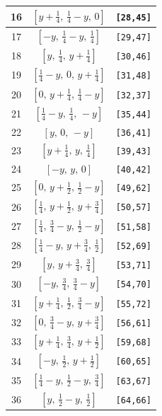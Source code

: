 \documentclass[fleqn,8pt]{jsarticle}
\begin{document}
\begin{longtable}{ccc}
16 & $\left[ y + \frac{1}{4},\, \frac{1}{4} - y,\, 0 \right]$ & {\tt [28,45]} \\ \hline
17 & $\left[ - y,\, \frac{1}{4} - y,\, \frac{1}{4} \right]$ & {\tt [29,47]} \\ \hline
18 & $\left[ y,\, \frac{1}{4},\, y + \frac{1}{4} \right]$ & {\tt [30,46]} \\ \hline
19 & $\left[ \frac{1}{4} - y,\, 0,\, y + \frac{1}{4} \right]$ & {\tt [31,48]} \\ \hline
20 & $\left[ 0,\, y + \frac{1}{4},\, \frac{1}{4} - y \right]$ & {\tt [32,37]} \\ \hline
21 & $\left[ \frac{1}{4} - y,\, \frac{1}{4},\, - y \right]$ & {\tt [35,44]} \\ \hline
22 & $\left[ y,\, 0,\, - y \right]$ & {\tt [36,41]} \\ \hline
23 & $\left[ y + \frac{1}{4},\, y,\, \frac{1}{4} \right]$ & {\tt [39,43]} \\ \hline
24 & $\left[ - y,\, y,\, 0 \right]$ & {\tt [40,42]} \\ \hline
25 & $\left[ 0,\, y + \frac{1}{2},\, \frac{1}{2} - y \right]$ & {\tt [49,62]} \\ \hline
26 & $\left[ \frac{1}{4},\, y + \frac{1}{2},\, y + \frac{3}{4} \right]$ & {\tt [50,57]} \\ \hline
27 & $\left[ \frac{1}{4},\, \frac{3}{4} - y,\, \frac{1}{2} - y \right]$ & {\tt [51,58]} \\ \hline
28 & $\left[ \frac{1}{4} - y,\, y + \frac{3}{4},\, \frac{1}{2} \right]$ & {\tt [52,69]} \\ \hline
29 & $\left[ y,\, y + \frac{3}{4},\, \frac{3}{4} \right]$ & {\tt [53,71]} \\ \hline
30 & $\left[ - y,\, \frac{3}{4},\, \frac{3}{4} - y \right]$ & {\tt [54,70]} \\ \hline
31 & $\left[ y + \frac{1}{4},\, \frac{1}{2},\, \frac{3}{4} - y \right]$ & {\tt [55,72]} \\ \hline
32 & $\left[ 0,\, \frac{3}{4} - y,\, y + \frac{3}{4} \right]$ & {\tt [56,61]} \\ \hline
33 & $\left[ y + \frac{1}{4},\, \frac{3}{4},\, y + \frac{1}{2} \right]$ & {\tt [59,68]} \\ \hline
34 & $\left[ - y,\, \frac{1}{2},\, y + \frac{1}{2} \right]$ & {\tt [60,65]} \\ \hline
35 & $\left[ \frac{1}{4} - y,\, \frac{1}{2} - y,\, \frac{3}{4} \right]$ & {\tt [63,67]} \\ \hline
36 & $\left[ y,\, \frac{1}{2} - y,\, \frac{1}{2} \right]$ & {\tt [64,66]} \\ \hline

\end{longtable}
\end{document}
